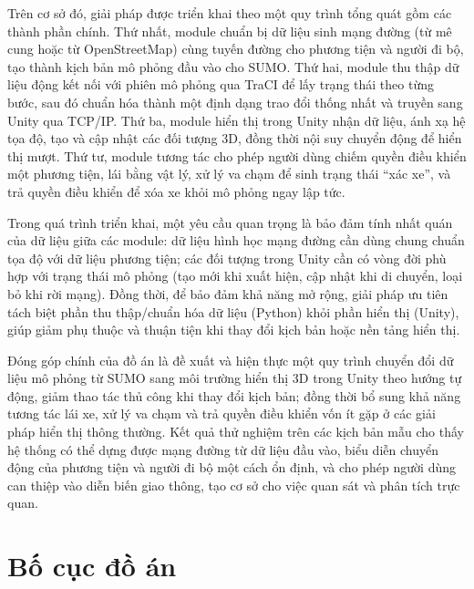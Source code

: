 \documentclass[../DoAn.tex]{subfiles}
\begin{document}
Trên cơ sở đó, giải pháp được triển khai theo một quy trình tổng quát gồm các
thành phần chính. Thứ nhất, module chuẩn bị dữ liệu sinh mạng đường (từ mê cung
hoặc từ OpenStreetMap) cùng tuyến đường cho phương tiện và người đi bộ, tạo
thành kịch bản mô phỏng đầu vào cho \gls{SUMO}. Thứ hai, module thu thập dữ liệu
động kết nối với phiên mô phỏng qua \gls{TraCI} để lấy trạng thái theo từng bước,
sau đó chuẩn hóa thành một định dạng trao đổi thống nhất và truyền sang Unity qua
TCP/IP. Thứ ba, module hiển thị trong Unity nhận dữ liệu, ánh xạ hệ tọa độ, tạo
và cập nhật các đối tượng 3D, đồng thời nội suy chuyển động để hiển thị mượt. Thứ
tư, module tương tác cho phép người dùng chiếm quyền điều khiển một phương tiện,
lái bằng vật lý, xử lý va chạm để sinh trạng thái ``xác xe'', và trả quyền điều
khiển để xóa xe khỏi mô phỏng ngay lập tức.

Trong quá trình triển khai, một yêu cầu quan trọng là bảo đảm tính nhất quán của
dữ liệu giữa các module: dữ liệu hình học mạng đường cần dùng chung chuẩn tọa độ
với dữ liệu phương tiện; các đối tượng trong Unity cần có vòng đời phù hợp với
trạng thái mô phỏng (tạo mới khi xuất hiện, cập nhật khi di chuyển, loại bỏ khi
rời mạng). Đồng thời, để bảo đảm khả năng mở rộng, giải pháp ưu tiên tách biệt
phần thu thập/chuẩn hóa dữ liệu (Python) khỏi phần hiển thị (Unity), giúp giảm
phụ thuộc và thuận tiện khi thay đổi kịch bản hoặc nền tảng hiển thị.

Đóng góp chính của đồ án là đề xuất và hiện thực một quy trình chuyển đổi dữ liệu
mô phỏng từ \gls{SUMO} sang môi trường hiển thị 3D trong Unity theo hướng tự
động, giảm thao tác thủ công khi thay đổi kịch bản; đồng thời bổ sung khả năng
tương tác lái xe, xử lý va chạm và trả quyền điều khiển vốn ít gặp ở các giải
pháp hiển thị thông thường. Kết quả thử nghiệm trên các kịch bản mẫu cho thấy hệ
thống có thể dựng được mạng đường từ dữ liệu đầu vào, biểu diễn chuyển động của
phương tiện và người đi bộ một cách ổn định, và cho phép người dùng can thiệp
vào diễn biến giao thông, tạo cơ sở cho việc quan sát và phân tích trực quan.

\section{Bố cục đồ án}
\label{section:1.4}
\end{document}
